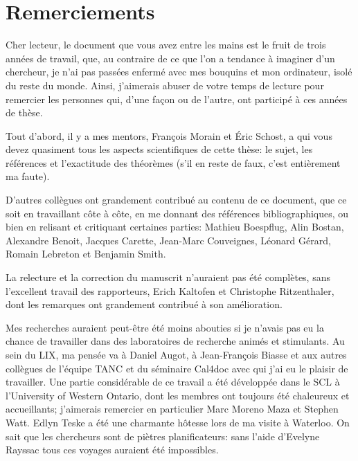 


\chapter*{Remerciements}

Cher lecteur, le document que vous avez entre les mains est le fruit
de trois années de travail, que, au contraire de ce que l'on a
tendance à imaginer d'un chercheur, je n'ai pas passées enfermé avec
mes bouquins et mon ordinateur, isolé du reste du monde. Ainsi,
j'aimerais abuser de votre temps de lecture pour remercier les
personnes qui, d'une façon ou de l'autre, ont participé à ces années
de thèse.

Tout d'abord, il y a mes mentors, François Morain et Éric Schost, a
qui vous devez quasiment tous les aspects scientifiques de cette
thèse: le sujet, les références et l'exactitude des théorèmes (s'il en
reste de faux, c'est entièrement ma faute).

D'autres collègues ont grandement contribué au contenu de ce document,
que ce soit en travaillant côte à côte, en me donnant des références
bibliographiques, ou bien en relisant et critiquant certaines parties:
Mathieu Boespflug, Alin Bostan, Alexandre Benoit, Jacques Carette,
Jean-Marc Couveignes, Léonard Gérard, Romain Lebreton et Benjamin
Smith.

La relecture et la correction du manuscrit n'auraient pas été
complètes, sans l'excellent travail des rapporteurs, Erich Kaltofen et
Christophe Ritzenthaler, dont les remarques ont grandement contribué à
son amélioration. 

Mes recherches auraient peut-être été moins abouties si je n'avais pas
eu la chance de travailler dans des laboratoires de recherche animés
et stimulants. Au sein du LIX, ma pensée va à Daniel Augot, à
Jean-François Biasse et aux autres collègues de l'équipe TANC et du
séminaire Cal4doc avec qui j'ai eu le plaisir de travailler.  Une
partie considérable de ce travail a été développée dans le SCL à
l'University of Western Ontario, dont les membres ont toujours été
chaleureux et accueillants; j'aimerais remercier en particulier Marc
Moreno Maza et Stephen Watt. Edlyn Teske a été une charmante hôtesse
lors de ma visite à Waterloo.  On sait que les chercheurs sont de
piètres planificateurs: sans l'aide d'Evelyne Rayssac tous ces voyages
auraient été impossibles.

